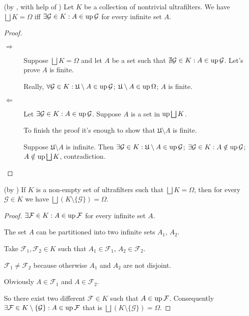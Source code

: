 \begin{lem}
(by , with help of ) Let
$K$ be a collection of nontrivial ultrafilters. We have $\bigsqcup K=\Omega$
iff $\exists\mathcal{G}\in K:A\in\operatorname{up}\mathcal{G}$ for every infinite
set $A$.\end{lem}
\begin{proof}
~
\begin{description}
\item [{$\Rightarrow$}] Suppose $\bigsqcup K=\Omega$ and let $A$ be
a set such that $\nexists\mathcal{G}\in K:A\in\operatorname{up}\mathcal{G}$. Let's
prove $A$ is finite.


Really, $\forall\mathcal{G}\in K:\mathfrak{U}\setminus A\in\operatorname{up}\mathcal{G}$;
$\mathfrak{U}\setminus A\in\operatorname{up}\Omega$; $A$ is finite.

\item [{$\Leftarrow$}] Let $\exists\mathcal{G}\in K:A\in\operatorname{up}\mathcal{G}$.
Suppose $A$ is a set in $\up\bigsqcup K$.


To finish the proof it's enough to show that $\mathfrak{U}\setminus A$
is finite.


Suppose $\mathfrak{U}\setminus A$ is infinite. Then $\exists\mathcal{G}\in K:\mathfrak{U}\setminus A\in\operatorname{up}\mathcal{G}$;
$\exists\mathcal{G}\in K:A\notin\operatorname{up}\mathcal{G}$; $A\notin\up\bigsqcup K$,
contradiction.

\end{description}
\end{proof}
\begin{lem}
(by ) If $K$ is a non-empty set of ultrafilters
such that $\bigsqcup K=\Omega$, then for every $\mathcal{G}\in K$
we have $\bigsqcup(K\setminus\{\mathcal{G}\})=\Omega$.\end{lem}
\begin{proof}
$\exists\mathcal{F}\in K:A\in\operatorname{up}\mathcal{F}$ for every infinite set
$A$.

The set $A$ can be partitioned into two infinite sets $A_{1}$, $A_{2}$.

Take $\mathcal{F}_{1},\mathcal{F}_{2}\in K$ such that $A_{1}\in\mathcal{F}_{1}$,
$A_{2}\in\mathcal{F}_{2}$.

$\mathcal{F}_{1}\ne\mathcal{F}_{2}$ because otherwise $A_{1}$ and
$A_{2}$ are not disjoint.

Obviously $A\in\mathcal{F}_{1}$ and $A\in\mathcal{F}_{2}$.

So there exist two different $\mathcal{F}\in K$ such that $A\in\operatorname{up}\mathcal{F}$.
Consequently $\exists\mathcal{F}\in K\setminus\{\mathcal{G}\}:A\in\operatorname{up}\mathcal{F}$
that is $\bigsqcup(K\setminus\{\mathcal{G}\})=\Omega$.\end{proof}
